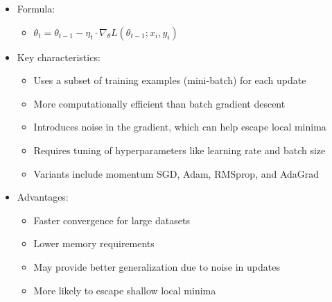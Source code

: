 \documentclass{article}
\begin{document}
\begin{itemize}
\begin{itemize}
        \item Formula:
        \begin{itemize}
            \item $\theta_t = \theta_{t-1} - \eta_t \cdot \nabla_\theta L(\theta_{t-1}; x_i, y_i)$
        \end{itemize}
        
        \item Key characteristics:
        \begin{itemize}
            \item Uses a subset of training examples (mini-batch) for each update
            \item More computationally efficient than batch gradient descent
            \item Introduces noise in the gradient, which can help escape local minima
            \item Requires tuning of hyperparameters like learning rate and batch size
            \item Variants include momentum SGD, Adam, RMSprop, and AdaGrad
        \end{itemize}
        
        \item Advantages:
        \begin{itemize}
            \item Faster convergence for large datasets
            \item Lower memory requirements
            \item May provide better generalization due to noise in updates
            \item More likely to escape shallow local minima
        \end{itemize}
    \end{itemize}
\end{itemize}
\end{document}
